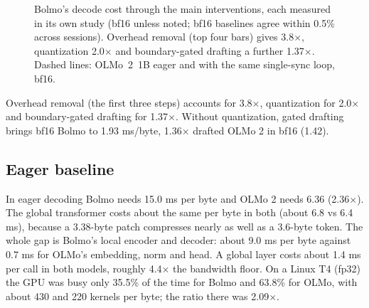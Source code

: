 \documentclass[11pt,a4paper]{article}
\newcommand{\x}{\ensuremath{\times}}
\begin{document}
\begin{figure}[tb]
\centering
{}
\caption{Bolmo's decode cost through the main interventions, each measured in its own study (bf16 unless noted; bf16 baselines agree within 0.5\% across sessions). Overhead removal (top four bars) gives 3.8\x, quantization 2.0\x{} and boundary-gated drafting a further 1.37\x. Dashed lines: OLMo~2~1B eager and with the same single-sync loop, bf16.}
\label{fig:cascade}
\end{figure}


Overhead removal (the first three steps) accounts for 3.8\x{}, quantization for 2.0\x{} and boundary-gated drafting for 1.37\x{}. Without quantization, gated drafting brings bf16 Bolmo to 1.93 ms/byte, 1.36\x{} drafted OLMo 2 in bf16 (1.42).

\subsection{Eager baseline}\label{eager-baseline}

In eager decoding Bolmo needs 15.0 ms per byte and OLMo 2 needs 6.36 (2.36\x{}). The global transformer costs about the same per byte in both (about 6.8 vs 6.4 ms), because a 3.38-byte patch compresses nearly as well as a 3.6-byte token. The whole gap is Bolmo's local encoder and decoder: about 9.0 ms per byte against 0.7 ms for OLMo's embedding, norm and head. A global layer costs about 1.4 ms per call in both models, roughly 4.4\x{} the bandwidth floor. On a Linux T4 (fp32) the GPU was busy only 35.5\% of the time for Bolmo and 63.8\% for OLMo, with about 430 and 220 kernels per byte; the ratio there was 2.09\x{}.
\end{document}
